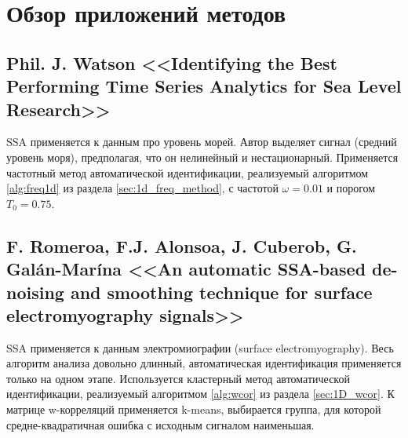 \documentclass[specialist,
               substylefile = spbu.rtx,
               subf,href,colorlinks=true, 12pt]{disser}
\begin{document}



\section{Обзор приложений методов}

\subsection{Phil. J. Watson <<Identifying the Best Performing Time Series
Analytics for Sea Level Research>> \cite{Watson2016} \cite{Watson2016b}}

SSA применяется к данным  про уровень морей. Автор выделяет сигнал (средний уровень моря), предполагая, что он нелинейный и нестационарный. Применяется частотный метод автоматической идентификации, реализуемый алгоритмом \ref{alg:freq1d} из раздела \ref{sec:1d_freq_method}, с частотой $\omega=0.01$ и порогом $T_0 = 0.75$.

\subsection{F. Romeroa, F.J. Alonsoa, J. Cuberob, G. Galán-Marína <<An automatic SSA-based de-noising and smoothing technique for surface electromyography signals>>
 \cite{Romeroa2015}}

SSA применяется к данным электромиографии (surface electromyography).
Весь алгоритм анализа довольно длинный, автоматическая идентификация применяется только на одном этапе.
Используется кластерный метод автоматической идентификации, реализуемый алгоритмом \ref{alg:wcor} из раздела \ref{sec:1D_wcor}. К матрице w-корреляций применяется k-means, выбирается группа, для которой средне-квадратичная ошибка с исходным сигналом наименьшая.
\end{document}
